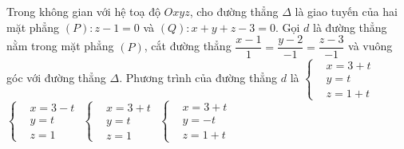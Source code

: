 \begin{ex}%
	Trong không gian với hệ toạ độ $Oxyz$, cho đường thẳng $ \Delta $ là giao tuyến của hai mặt phẳng $(P)\colon z-1=0$ và $(Q)\colon x+y+z-3=0$. Gọi $d$ là đường thẳng nằm trong mặt phẳng $(P)$, cắt đường thẳng $\dfrac{x-1}{1}=\dfrac{y-2}{-1}=\dfrac{z-3}{-1}$ và vuông góc với đường thẳng $ \Delta $. Phương trình của đường thẳng $d$ là
	\choice
	{$\left\{\begin{aligned}
		&x=3+t \\
		&y=t \\
		&z=1+t
		\end{aligned}\right. $}
	{$\left\{\begin{aligned}
		&x=3-t \\
		&y=t \\
		&z=1
		\end{aligned}\right. $}
	{\True $\left\{\begin{aligned}
		&x=3+t \\
		&y=t \\
		&z=1
		\end{aligned}\right. $}
	{$\left\{\begin{aligned}
		&x=3+t \\
		&y=-t \\
		&z=1+t
		\end{aligned}\right. $}
\end{ex}
